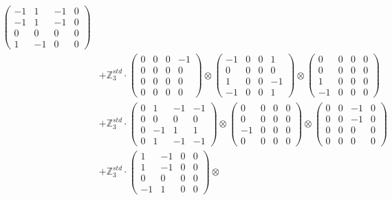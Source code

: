 \documentclass{article}
\begin{document}
{\begin{align}
            \begin{pmatrix} -1 & 1 & -1 & 0 \\ -1 & 1 & -1 & 0 \\ 0 & 0 & 0 & 0 \\ 1 & -1 & 0 & 0 \end{pmatrix} \\ 
        &+ \label{Rs16-Rc11-Solution-31-c25} \mathbb{Z}_3^{std} \cdot 
            \begin{pmatrix} 0 & 0 & 0 & -1 \\ 0 & 0 & 0 & 0 \\ 0 & 0 & 0 & 0 \\ 0 & 0 & 0 & 0 \end{pmatrix} \otimes 
            \begin{pmatrix} -1 & 0 & 0 & 1 \\ 0 & 0 & 0 & 0 \\ 1 & 0 & 0 & -1 \\ -1 & 0 & 0 & 1 \end{pmatrix} \otimes 
            \begin{pmatrix} 0 & 0 & 0 & 0 \\ 0 & 0 & 0 & 0 \\ 1 & 0 & 0 & 0 \\ -1 & 0 & 0 & 0 \end{pmatrix} \\ 
        &+ \label{Rs16-Rc11-Solution-31-c26} \mathbb{Z}_3^{std} \cdot 
            \begin{pmatrix} 0 & 1 & -1 & -1 \\ 0 & 0 & 0 & 0 \\ 0 & -1 & 1 & 1 \\ 0 & 1 & -1 & -1 \end{pmatrix} \otimes 
            \begin{pmatrix} 0 & 0 & 0 & 0 \\ 0 & 0 & 0 & 0 \\ -1 & 0 & 0 & 0 \\ 0 & 0 & 0 & 0 \end{pmatrix} \otimes 
            \begin{pmatrix} 0 & 0 & -1 & 0 \\ 0 & 0 & -1 & 0 \\ 0 & 0 & 0 & 0 \\ 0 & 0 & 0 & 0 \end{pmatrix} \\ 
        &+ \label{Rs16-Rc11-Solution-31-c27} \mathbb{Z}_3^{std} \cdot 
            \begin{pmatrix} 1 & -1 & 0 & 0 \\ 1 & -1 & 0 & 0 \\ 0 & 0 & 0 & 0 \\ -1 & 1 & 0 & 0 \end{pmatrix} \otimes 

\end{align}}
\end{document}
